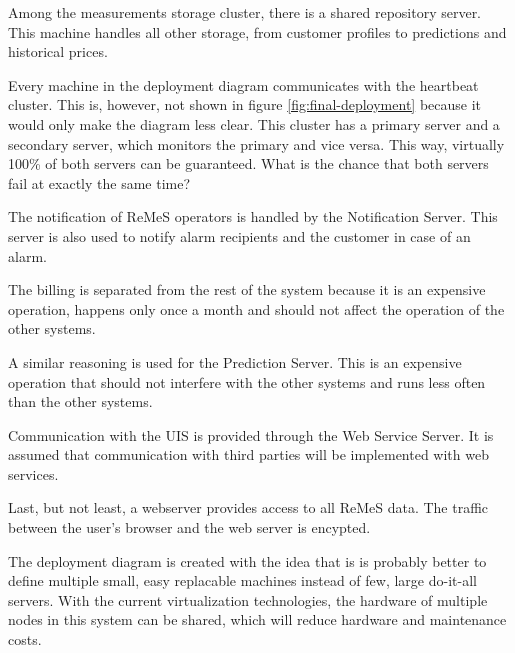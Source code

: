 \npar Among the measurements storage cluster, there is a shared repository
server. This machine handles all other storage, from customer profiles to
predictions and historical prices. 

\npar Every machine in the deployment diagram communicates with the heartbeat
cluster. This is, however, not shown in figure \ref{fig:final-deployment}
because it would only make the diagram less clear. This cluster has a primary
server and a secondary server, which monitors the primary and vice versa. This
way, virtually 100\% of both servers can be guaranteed. What is the chance that
both servers fail at exactly the same time?

\npar The notification of ReMeS operators is handled by the Notification Server.
This server is also used to notify alarm recipients and the customer in case of
an alarm. 

\npar The billing is separated from the rest of the system because it is an
expensive operation, happens only once a month and should not affect the
operation of the other systems. 

\npar A similar reasoning is used for the Prediction Server. This is an
expensive operation that should not interfere with the other systems and runs
less often than the other systems.

\npar Communication with the UIS is provided through the Web Service Server. It
is assumed that communication with third parties will be implemented with web
services. 

\npar Last, but not least, a webserver provides access to all ReMeS data. The
traffic between the user's browser and the web server is encypted.

\npar The deployment diagram is created with the idea that is is probably better
to define multiple small, easy replacable machines instead of few, large
do-it-all servers. With the current virtualization technologies, the hardware of
multiple nodes in this system can be shared, which will reduce hardware and
maintenance costs.